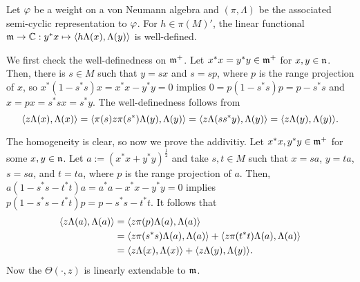 \documentclass{../../small}
\begin{document}
\begin{prop}
Let $\varphi$ be a weight on a von Neumann algebra and $(\pi,\Lambda)$ be the associated semi-cyclic representation to $\varphi$.
For $h\in\pi(M)'$, the linear functional $\mathfrak{m}\to\mathbb{C}:y^*x\mapsto\langle h\Lambda(x),\Lambda(y)\rangle$ is well-defined.
\end{prop}
\begin{pf}
We first check the well-definedness on $\mathfrak{m}^+$.
Let $x^*x=y^*y\in\mathfrak{m}^+$ for $x,y\in\mathfrak{n}$.
Then, there is $s\in M$ such that $y=sx$ and $s=sp$, where $p$ is the range projection of $x$, so $x^*(1-s^*s)x=x^*x-y^*y=0$ implies $0=p(1-s^*s)p=p-s^*s$ and $x=px=s^*sx=s^*y$.
The well-definedness follows from
\[\langle z\Lambda(x),\Lambda(x)\rangle=\langle\pi(s)z\pi(s^*)\Lambda(y),\Lambda(y)\rangle=\langle z\Lambda(ss^*y),\Lambda(y)\rangle=\langle z\Lambda(y),\Lambda(y)\rangle.\]

The homogeneity is clear, so now we prove the addivitiy.
Let $x^*x,y^*y\in\mathfrak{m}^+$ for some $x,y\in\mathfrak{n}$.
Let $a:=(x^*x+y^*y)^{\frac12}$ and take $s,t\in M$ such that $x=sa$, $y=ta$, $s=sa$, and $t=ta$, where $p$ is the range projection of $a$.
Then, $a(1-s^*s-t^*t)a=a^*a-x^*x-y^*y=0$ implies $p(1-s^*s-t^*t)p=p-s^*s-t^*t$.
It follows that
\begin{align*}
\langle z\Lambda(a),\Lambda(a)\rangle
&=\langle z\pi(p)\Lambda(a),\Lambda(a)\rangle\\
&=\langle z\pi(s^*s)\Lambda(a),\Lambda(a)\rangle+\langle z\pi(t^*t)\Lambda(a),\Lambda(a)\rangle\\
&=\langle z\Lambda(x),\Lambda(x)\rangle+\langle z\Lambda(y),\Lambda(y)\rangle.
\end{align*}
Now the $\Theta(\cdot,z)$ is linearly extendable to $\mathfrak{m}$.
\end{pf}
\end{document}
